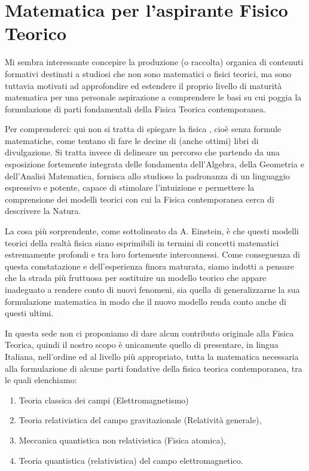 \chapter{Matematica per l'aspirante Fisico Teorico}\label{app:A0}

Mi sembra interessante concepire la produzione (o raccolta) organica di contenuti formativi
destinati a studiosi che non sono matematici o fisici teorici, ma sono tuttavia motivati ad approfondire ed estendere il proprio livello di maturità matematica per una personale aspirazione a comprendere le basi su cui poggia la formulazione di parti fondamentali della Fisica Teorica contemporanea.

Per comprenderci: qui non si tratta di spiegare la fisica , cioè senza formule matematiche, come tentano di fare le decine di (anche ottimi) libri di divulgazione. Si tratta invece di delineare un percorso che partendo da una esposizione fortemente integrata delle  fondamenta dell'Algebra, della Geometria e  dell'Analisi Matematica, fornisca allo studioso la padronanza di un linguaggio espressivo e potente, capace di stimolare l'intuizione e permettere la comprensione dei modelli teorici con cui la Fisica contemporanea cerca di descrivere la Natura. 

La cosa più sorprendente, come sottolineato da A. Einstein, è che questi modelli teorici della realtà fisica siano esprimibili in termini di concetti matematici estremamente profondi e tra loro fortemente interconnessi. Come conseguenza di questa constatazione e dell'esperienza finora maturata, siamo indotti a pensare che la strada più fruttuosa per sostituire un modello teorico che appare inadeguato a rendere conto di nuovi fenomeni, sia quella di generalizzarne la sua formulazione matematica in modo che il nuovo modello renda conto anche di questi ultimi.

In questa sede non ci proponiamo di dare alcun contributo originale alla Fisica Teorica, quindi il nostro scopo è unicamente quello di presentare, in lingua Italiana, nell'ordine ed al livello più appropriato, tutta la matematica necessaria alla formulazione di alcune parti fondative della fisica teorica contemporanea, tra le quali elenchiamo:\\

\begin{enumerate}[I]
\item Teoria classica dei campi (Elettromagnetismo)
\item Teoria relativistica del campo gravitazionale (Relatività generale),
\item Meccanica quantistica non relativistica (Fisica atomica),
\item Teoria quantistica (relativistica) del campo elettromagnetico. 
\end{enumerate} 

